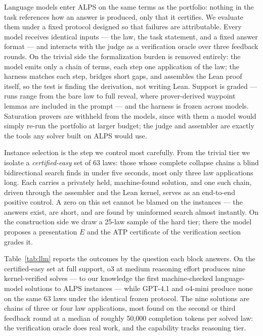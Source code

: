 Language models enter ALPS on the same terms as the portfolio: nothing in the
task references how an answer is produced, only that it certifies. We
evaluate them under a fixed protocol designed so that failures are
attributable. Every model receives identical inputs — the law, the task
statement, and a fixed answer format — and interacts with the judge as a
verification oracle over three feedback rounds. On the trivial side the
formalization burden is removed entirely: the model emits only a chain of
terms, each step one application of the law; the harness matches each step,
bridges short gaps, and assembles the Lean proof itself, so the test is
finding the derivation, not writing Lean. Support is graded — runs range
from the bare law to full reveal, where prover-derived waypoint lemmas are
included in the prompt — and the harness is frozen across models. Saturation
provers are withheld from the models, since with them a model would simply
re-run the portfolio at larger budget; the judge and assembler are exactly
the tools any solver built on ALPS would use.

Instance selection is the step we control most carefully. From the trivial
tier we isolate a \emph{certified-easy} set of 63 laws: those whose complete
collapse chains a blind bidirectional search finds in under five seconds,
most only three law applications long. Each carries a privately held,
machine-found solution, and one such chain, driven through the assembler and
the Lean kernel, serves as an end-to-end positive control. A zero on this
set cannot be blamed on the instances — the answers exist, are short, and
are found by uninformed search almost instantly. On the construction side we
draw a 25-law sample of the hard tier; there the model proposes a
presentation $E$ and the ATP certificate of the verification section grades
it.

Table~\ref{tab:llm} reports the outcomes by the question each block
answers. On the certified-easy set at full support, o3 at medium reasoning
effort produces nine kernel-verified solves — to our knowledge the first
machine-checked language-model solutions to ALPS instances — while GPT-4.1
and o4-mini produce none on the same 63 laws under the identical frozen
protocol. The nine solutions are chains of three or four law applications,
most found on the second or third feedback round at a median of roughly
50{,}000 completion tokens per solved law: the verification oracle does real
work, and the capability tracks reasoning tier.

